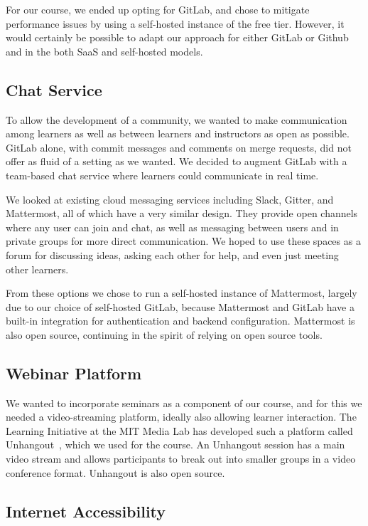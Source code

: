 \documentclass[12pt,twoside]{mitthesis}
\begin{document}
For our course, we ended up opting for GitLab, and chose to mitigate performance issues by using a self-hosted instance of the free tier. However, it would certainly be possible to adapt our approach for either GitLab or Github and in the both SaaS and self-hosted models.

\subsection{Chat Service}

To allow the development of a community, we wanted to make communication among learners as well as between learners and instructors as open as possible. GitLab alone, with commit messages and comments on merge requests, did not offer as fluid of a setting as we wanted. We decided to augment GitLab with a team-based chat service where learners could communicate in real time.

We looked at existing cloud messaging services including Slack, Gitter, and Mattermost, all of which have a very similar design. They provide open channels where any user can join and chat, as well as messaging between users and in private groups for more direct communication. We hoped to use these spaces as a forum for discussing ideas, asking each other for help, and even just meeting other learners.

From these options we chose to run a self-hosted instance of Mattermost, largely due to our choice of self-hosted GitLab, because Mattermost and GitLab have a built-in integration for authentication and backend configuration. Mattermost is also open source, continuing in the spirit of relying on open source tools.

\subsection{Webinar Platform}

We wanted to incorporate seminars as a component of our course, and for this we needed a video-streaming platform, ideally also allowing learner interaction. The Learning Initiative at the MIT Media Lab has developed such a platform called Unhangout~\cite{unhangout}, which we used for the course. An Unhangout session has a main video stream and allows participants to break out into smaller groups in a video conference format. Unhangout is also open source.

\subsection{Internet Accessibility}
\end{document}
